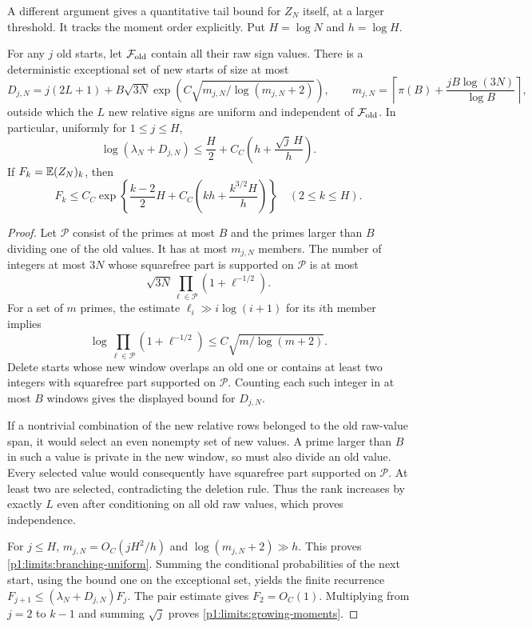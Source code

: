 A different argument gives a quantitative tail bound for $Z_N$ itself,
at a larger threshold.  It tracks the moment order explicitly.
Put $H=\log N$ and $h=\log H$.

\begin{lemma}
\label{p1:limits:branching}
For any $j$ old starts, let $\mathcal F_{\rm old}$ contain all
their raw sign values.  There is a deterministic exceptional set of
new starts of size at most
\[
 D_{j,N}=j(2L+1)+B\sqrt{3N}
       \exp\left(C\sqrt{m_{j,N}/\log(m_{j,N}+2)}\right),
 \qquad
 m_{j,N}=\left\lceil\pi(B)+\frac{jB\log(3N)}{\log B}\right\rceil,
\]
outside which the $L$ new relative signs are uniform and independent
of $\mathcal F_{\rm old}$.  In particular, uniformly for $1\le j\le H$,
\begin{equation}
 \log(\lambda_N+D_{j,N})
       \le\frac H2+C_C\left(h+\frac{\sqrt j\,H}{h}\right).
 \label{p1:limits:branching-uniform}
\end{equation}
If $F_k=\mathbb E(Z_N)_k$, then
\begin{equation}
 F_k\le C_C\exp\left\{
   \frac{k-2}{2}H+C_C\left(kh+\frac{k^{3/2}H}{h}\right)
                     \right\}\quad(2\le k\le H).
 \label{p1:limits:growing-moments}
\end{equation}
\end{lemma}
\begin{proof}
Let $\mathcal P$ consist of the primes at most $B$ and the primes
larger than $B$ dividing one of the old values.  It has at most
$m_{j,N}$ members.  The number of integers at most $3N$ whose
squarefree part is supported on $\mathcal P$ is at most
\[
 \sqrt{3N}\prod_{\ell\in\mathcal P}(1+\ell^{-1/2}).
\]
For a set of $m$ primes, the estimate
$\ell_i\gg i\log(i+1)$ for its $i$th member implies
\[
 \log\prod_{\ell\in\mathcal P}(1+\ell^{-1/2})
       \le C\sqrt{m/\log(m+2)}.
\]
Delete starts whose new window overlaps an old one or contains
at least two integers with squarefree part supported on
$\mathcal P$.  Counting each such integer in at most $B$ windows
gives the displayed bound for $D_{j,N}$.

If a nontrivial combination of the new relative rows belonged
to the old raw-value span, it would select an even nonempty set
of new values.  A prime larger than $B$ in such a value is private
in the new window, so must also divide an old value.  Every
selected value would consequently have squarefree part supported
on $\mathcal P$.  At least two are selected, contradicting the
deletion rule.  Thus the rank increases by exactly $L$ even after
conditioning on all old raw values, which proves independence.

For $j\le H$, $m_{j,N}=O_C(jH^2/h)$ and
$\log(m_{j,N}+2)\gg h$.  This proves
\eqref{p1:limits:branching-uniform}.  Summing the conditional
probabilities of the next start, using the bound one on the
exceptional set, yields the finite recurrence
$F_{j+1}\le(\lambda_N+D_{j,N})F_j$.
The pair estimate gives $F_2=O_C(1)$.  Multiplying from $j=2$
to $k-1$ and summing $\sqrt j$ proves
\eqref{p1:limits:growing-moments}.
\end{proof}

